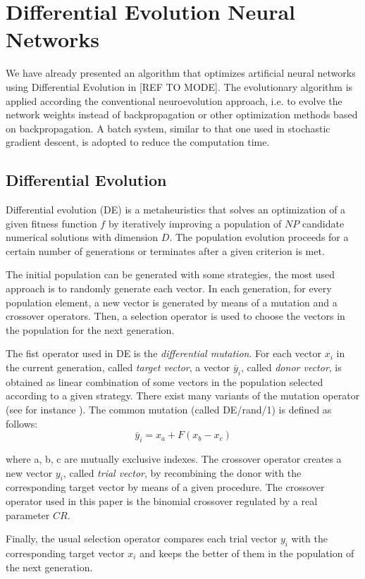 \section{Differential Evolution Neural Networks}
We have already presented an algorithm that optimizes artificial neural networks using Differential Evolution in [REF TO MODE]. 
The evolutionary algorithm is applied according the conventional neuroevolution approach, i.e. to evolve the network weights instead of backpropagation or other optimization methods based on backpropagation. A batch system, similar to that one used in stochastic gradient descent, is adopted to reduce the computation time.

\subsection{Differential Evolution}
Differential evolution (DE) is a metaheuristics that solves an optimization of a given fitness function $f$ by iteratively improving a population of $NP$ candidate numerical solutions with dimension $D$.
The population evolution proceeds for a certain number of generations or terminates after a given criterion is met.

The initial population can be generated with some strategies, the most used approach is to randomly generate each vector.
In each generation, for every population element, a new vector is generated by means of a mutation and a crossover operators.
Then, a selection operator is used to choose the vectors in the population for the next generation. 

The fist operator used in DE is the {\it differential mutation}. For each vector $x_i$ in the current generation, called {\it target vector}, a vector $\bar y_i$, called {\it donor vector}, is obtained as linear combination of some vectors in the population selected according
to a given strategy.
There exist many variants of the mutation operator (see for instance \cite{surveyDE_2011,surveyDE_2016}). 
The common mutation (called DE/rand/1) is defined as follows:
$$\bar y_i = x_a + F(x_b - x_c)$$

where a, b, c are mutually exclusive indexes.
The crossover operator creates a new vector $y_i$, called {\it trial vector}, by recombining the donor with the corresponding target vector by means of a given procedure. The crossover operator used in this paper is the binomial crossover regulated by a real parameter $CR$.

Finally, the usual selection operator compares each trial vector $y_i$ with the corresponding target vector $x_i$ and keeps the better of them in the population of the next generation.

